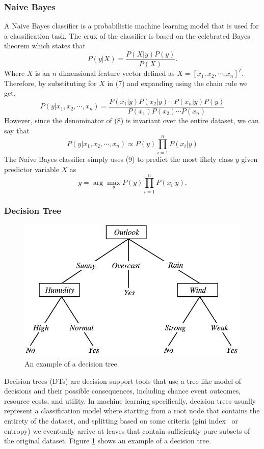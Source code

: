 \documentclass[journal,onecolumn]{IEEEtran}
\begin{document}
\subsubsection{Naive Bayes}
A Naive Bayes classifier is a probabilistic machine learning model that is used for a classification task.
The crux of the classifier is based on the celebrated Bayes theorem which states that \cite{nb}
\begin{equation}
  P(y|X) = \frac{P(X|y)P(y)}{P(X)}.
\end{equation}
Where $X$ is an $n$ dimensional feature vector defined as $X = [x_1, x_2, \cdots, x_n]^T$.
Therefore, by substituting for $X$ in (7) and expanding using the chain rule we get,
\begin{equation}
  P(y|x_1,x_2,\cdots,x_n) = \frac{P(x_1|y)P(x_2|y)\cdots P(x_n|y)P(y)}{P(x_1)P(x_2)\cdots P(x_n)}
\end{equation}
However, since the denominator of (8) is invariant over the entire dataset, we can say that
\begin{equation}
  P(y|x_1,x_2,\cdots,x_n) \propto P(y)\prod_{i=1}^nP(x_i|y)
\end{equation}
The Naive Bayes classifier simply uses (9) to predict the most likely class $y$ given predictor variable $X$ as
\begin{equation}
  y = \arg\!\max_y P(y)\prod_{i=1}^nP(x_i|y).
\end{equation}
\subsubsection{Decision Tree}
\begin{figure}
  \centering
  \includegraphics[width=0.4\linewidth]{figures/dt.png}
  \caption{An example of a decision tree.}
  \label{fig:dt}
\end{figure}
Decision trees (DTs) are decision support tools that use a tree-like model of decisions and their possible consequences,
including chance event outcomes, resource costs, and utility. In machine learning specifically, decision trees usually represent
a classification model where starting from a root node that contains the entirety of the dataset, and splitting based
on some criteria (gini index~\cite{gini} or entropy) we eventually arrive at leaves that contain sufficiently pure
subsets of the original dataset. Figure \ref{fig:dt} shows an example of a decision tree.
\end{document}
